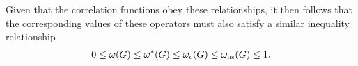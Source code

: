 Given that the correlation functions obey these relationships, it then follows that the corresponding values of these operators must also satisfy a similar inequality relationship
\begin{align}
	0 \leq \omega(G) \leq \omega^*(G) \leq \omega_c(G) \leq \omega_{\textnormal{ns}}(G) \leq 1. 
\end{align}



%
